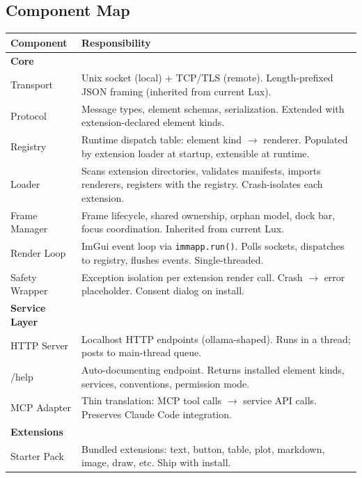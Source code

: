 \documentclass[a4paper,10pt]{article}
\begin{document}
\subsection{Component Map}

\begin{center}
\small
\begin{tabularx}{\linewidth}{@{}l>{\raggedright\arraybackslash}X@{}}
\toprule
\textbf{Component} & \textbf{Responsibility} \\
\midrule
\textbf{Core} & \\
\quad Transport     & Unix socket (local) + TCP/TLS (remote).
  Length-prefixed JSON framing (inherited from current Lux). \\
\quad Protocol      & Message types, element schemas, serialization.
  Extended with extension-declared element kinds. \\
\quad Registry      & Runtime dispatch table: element kind $\to$
  renderer.  Populated by extension loader at startup,
  extensible at runtime. \\
\quad Loader        & Scans extension directories, validates manifests,
  imports renderers, registers with the registry.
  Crash-isolates each extension. \\
\quad Frame Manager & Frame lifecycle, shared ownership, orphan model,
  dock bar, focus coordination.  Inherited from current Lux. \\
\quad Render Loop   & ImGui event loop via \texttt{immapp.run()}.
  Polls sockets, dispatches to registry, flushes events.
  Single-threaded. \\
\quad Safety Wrapper & Exception isolation per extension render call.
  Crash $\to$ error placeholder.  Consent dialog on install. \\
\midrule
\textbf{Service Layer} & \\
\quad HTTP Server   & Localhost HTTP endpoints (ollama-shaped).
  Runs in a thread; posts to main-thread queue. \\
\quad /help         & Auto-documenting endpoint.  Returns installed
  element kinds, services, conventions, permission mode. \\
\quad MCP Adapter   & Thin translation: MCP tool calls $\to$ service
  API calls.  Preserves Claude Code integration. \\
\midrule
\textbf{Extensions} & \\
\quad Starter Pack  & Bundled extensions: text, button, table, plot,
  markdown, image, draw, etc.  Ship with install. \\

\end{tabularx}
\end{center}
\end{document}
